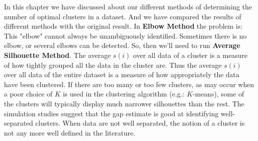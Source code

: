 In this chapter we have discussed about our different methods of determining the number of optimal clusters
in a dataset. And we have compared the results of different methods with the original result. In \textbf{Elbow Method}
the problem  is:  This  "elbow"  cannot always  be  unambiguously  identified.  Sometimes  there  is  no  elbow,  or
several elbows can be detected. So, then we'll need to run \textbf{Average Silhouette Method}. The average $s(i)$ over all data
of a cluster is a measure of how tightly grouped all the data in the cluster are. Thus the average $s(i)$ over all data
of the entire dataset is a measure of how appropriately the data have been clustered. If there are too many or too few
clusters, as may occur when a poor choice of $K$ is used in the clustering algorithm (e.g.: $K$-means), some of the
clusters will typically display much narrower silhouettes than the rest. The simulation studies suggest that the gap
estimate is good at identifying well-separated clusters. When data are not well separated, the notion of a cluster is
not any more well defined in the literature.


\endinput
